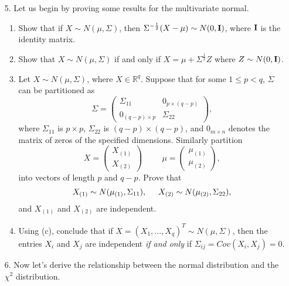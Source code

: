 \documentclass[11pt]{article}
\begin{document}
\begin{enumerate}

\item[5.] Let us begin by proving some results for the multivariate normal.

\begin{enumerate}

\item Show that if $X \sim N(\mu, \Sigma)$, then $\Sigma^{-\frac{1}{2}} (X - \mu) \sim N(0, {\bf I})$, where ${\bf I}$ is the identity matrix.

\item Show that $X \sim N(\mu, \Sigma)$ if and only if $X = \mu + \Sigma^{\frac{1}{2}} Z$ where $Z \sim N(0, {\bf I})$.

\item Let $X \sim N(\mu, \Sigma)$, where $X \in \mathbb{R}^q$. Suppose that for some $1 \leq p < q$, $\Sigma$ can be partitioned as
$$\Sigma = \begin{pmatrix}
\Sigma_{11} & 0_{p \times (q - p)} \\
0_{(q - p) \times p} & \Sigma_{22}
\end{pmatrix},$$
where $\Sigma_{11}$ is $p \times p$, $\Sigma_{22}$ is $(q - p) \times (q - p)$, and $0_{m \times n}$ denotes the matrix of zeros of the specified dimensions. Similarly partition 
$$X = \begin{pmatrix}
X_{(1)} \\
X_{(2)}
\end{pmatrix} \hspace{1cm} \mu = \begin{pmatrix}
\mu_{(1)} \\
\mu_{(2)}
\end{pmatrix},$$
into vectors of length $p$ and $q - p$. Prove that 
$$X_{(1)} \sim N(\mu_{(1)}, \Sigma_{11}), \hspace{0.5cm} X_{(2)} \sim N(\mu_{(2)}, \Sigma_{22}),$$
and $X_{(1)}$ and $X_{(2)}$ are independent.

\item Using (c), conclude that if $X = (X_1,...,X_q)^T \sim N(\mu, \Sigma)$, then the entries $X_i$ and $X_j$ are independent \textit{if and only} if $\Sigma_{ij} = Cov(X_i, X_j) = 0$.

\end{enumerate}

\item[6.] Now let's derive the relationship between the normal distribution and the $\chi^2$ distribution. 


\end{enumerate}
\end{document}
